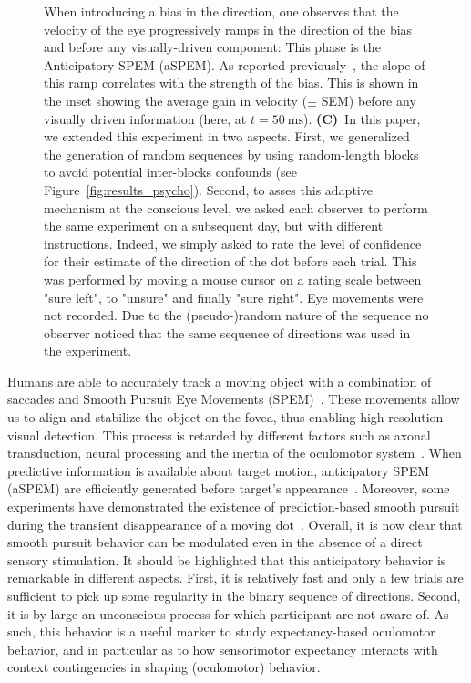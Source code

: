 \documentclass[profile,final,english, draft]{article}%
\newcommand{\ms}{\si{\milli\second}}%
\newcommand{\citep}[1]{\parencite{#1}}
\newcommand{\seeFig}[1]{see Figure~\ref{fig:#1}}
\begin{document}
\begin{figure}
{When introducing a bias in the direction,
one observes that the velocity of the eye progressively ramps
in the direction of the bias and before any visually-driven component:
This phase is the Anticipatory SPEM (aSPEM).
As reported previously~\citep{Montagnini2010, SantosKowler2017},
the slope of this ramp correlates with the strength of the bias.
This is shown in the inset showing the average gain in velocity ($\pm$ SEM)
before any visually driven information (here, at $t=50~\ms$).
\textbf{(C)}~In this paper, we extended this experiment in two aspects.
First, we generalized the generation of random sequences
by using random-length blocks
to avoid potential inter-blocks confounds (\seeFig{results_psycho}).
Second, to asses this adaptive mechanism at the conscious level,
we asked each observer to perform the same experiment on a subsequent day,
but with different instructions.
Indeed, we simply asked to rate the level of confidence
for their estimate of the direction of the dot before each trial.
This was performed by moving a mouse cursor on a rating scale
between "sure left", to "unsure" and finally "sure right".
Eye movements were not recorded.
Due to the (pseudo-)random nature of the sequence no observer noticed
that the same sequence of directions was used in the experiment.
}
\label{fig:intro}
\end{figure}
Humans are able to accurately track a moving object
with a combination of saccades and
Smooth Pursuit Eye Movements (SPEM)~\citep{ref}.
These movements allow us to align and
stabilize the object on the fovea,
thus enabling high-resolution visual detection.
This process is retarded by different factors such as axonal transduction,
neural processing and the inertia of the oculomotor system~\citep{Krauzlis}.
When predictive information is available about target motion,
anticipatory SPEM (aSPEM) are
efficiently generated before target's appearance~\citep{Westheimer1954, Kowler1979a, Kowler1979b}.
Moreover, some experiments have demonstrated the existence
of prediction-based smooth pursuit during
the transient disappearance of a moving dot~\citep{Badler2006,BeckerFuchs1985}.
Overall, it is now clear that smooth pursuit behavior
can be modulated even in the absence of a direct sensory stimulation.
It should be highlighted that this anticipatory behavior is remarkable 
in different aspects. 
First, it is relatively fast and only a few trials are sufficient
to pick up some regularity in the binary sequence of directions.
Second, it is by large an unconscious process
for which participant are not aware of.
As such, this behavior is a useful marker 
to study expectancy-based oculomotor behavior,
and in particular as to how sensorimotor expectancy interacts
with context contingencies in shaping (oculomotor) behavior.
\end{document}
